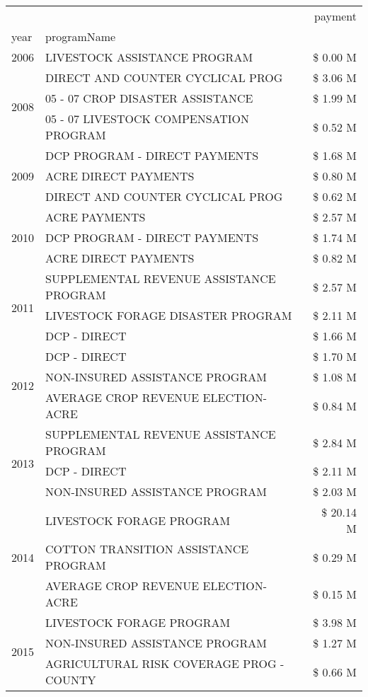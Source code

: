 \begin{tabular}{llr}
\toprule
 &  & payment \\
year & programName &  \\
\midrule
2006 & LIVESTOCK ASSISTANCE PROGRAM & \$ 0.00 M \\
\cline{1-3}
\multirow[t]{3}{*}{2008} & DIRECT AND COUNTER CYCLICAL PROG & \$ 3.06 M \\
 & 05 - 07 CROP DISASTER ASSISTANCE & \$ 1.99 M \\
 & 05 - 07 LIVESTOCK COMPENSATION PROGRAM & \$ 0.52 M \\
\cline{1-3}
\multirow[t]{3}{*}{2009} & DCP PROGRAM - DIRECT PAYMENTS & \$ 1.68 M \\
 & ACRE DIRECT PAYMENTS & \$ 0.80 M \\
 & DIRECT AND COUNTER CYCLICAL PROG & \$ 0.62 M \\
\cline{1-3}
\multirow[t]{3}{*}{2010} & ACRE PAYMENTS & \$ 2.57 M \\
 & DCP PROGRAM - DIRECT PAYMENTS & \$ 1.74 M \\
 & ACRE DIRECT PAYMENTS & \$ 0.82 M \\
\cline{1-3}
\multirow[t]{3}{*}{2011} & SUPPLEMENTAL REVENUE ASSISTANCE PROGRAM & \$ 2.57 M \\
 & LIVESTOCK FORAGE DISASTER PROGRAM & \$ 2.11 M \\
 & DCP - DIRECT & \$ 1.66 M \\
\cline{1-3}
\multirow[t]{3}{*}{2012} & DCP - DIRECT & \$ 1.70 M \\
 & NON-INSURED ASSISTANCE PROGRAM & \$ 1.08 M \\
 & AVERAGE CROP REVENUE ELECTION-ACRE & \$ 0.84 M \\
\cline{1-3}
\multirow[t]{3}{*}{2013} & SUPPLEMENTAL REVENUE ASSISTANCE PROGRAM & \$ 2.84 M \\
 & DCP - DIRECT & \$ 2.11 M \\
 & NON-INSURED ASSISTANCE PROGRAM & \$ 2.03 M \\
\cline{1-3}
\multirow[t]{3}{*}{2014} & LIVESTOCK FORAGE PROGRAM & \$ 20.14 M \\
 & COTTON TRANSITION ASSISTANCE PROGRAM & \$ 0.29 M \\
 & AVERAGE CROP REVENUE ELECTION-ACRE & \$ 0.15 M \\
\cline{1-3}
\multirow[t]{3}{*}{2015} & LIVESTOCK FORAGE PROGRAM & \$ 3.98 M \\
 & NON-INSURED ASSISTANCE PROGRAM & \$ 1.27 M \\
 & AGRICULTURAL RISK COVERAGE PROG - COUNTY & \$ 0.66 M \\

\end{tabular}
